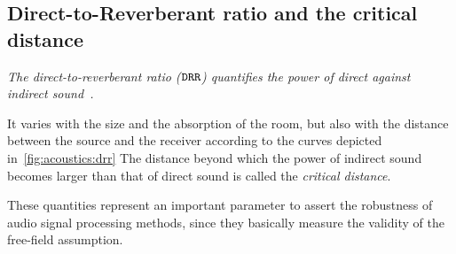 \subsection{Direct-to-Reverberant ratio and the critical distance}\label{ch:acoustics:subsec:drr}
\begin{center}
    \textit{The direct-to-reverberant ratio ($\mathtt{DRR}$) quantifies the power of direct against indirect sound~.}
\end{center}
It varies with the size and the absorption of the room, but also with the distance between the source and the receiver according to the curves
depicted in~\cref{fig:acoustics:drr}
The distance beyond which the power of indirect sound becomes larger than that of direct sound is called the \textit{critical distance}.

These quantities represent an important parameter to assert the robustness of audio signal processing methods,
since they basically measure the validity of the free-field assumption.

